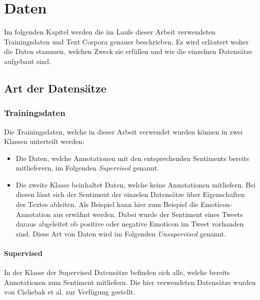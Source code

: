 \chapter{Daten}
Im  folgenden Kapitel werden die im Laufe dieser Arbeit verwendeten Trainingsdaten und Text Corpora genauer beschrieben. Es wird erläutert woher die Daten stammen, welchen Zweck sie erfüllen und wie die einzelnen Datensätze aufgebaut sind.

\section{Art der Datensätze}
\subsection{Trainingsdaten}
Die Trainingsdaten, welche in dieser Arbeit verwendet wurden können in zwei Klassen unterteilt werden:

\begin{itemize}
	\item Die Daten, welche Annotationen mit den entsprechenden Sentiments bereits mitlieferern, im Folgenden \emph{Supervised} genannt.
	\item Die zweite Klasse beinhaltet Daten, welche keine Annotationen mitliefern. Bei diesen lässt sich der Sentiment der einzelen Datensätze über Eigenschaften des Textes ableiten. Als Beispiel kann hier zum Beispiel die Emoticon-Annotation aus \cite{DeriuMasterThesis} erwähnt werden. Dabei wurde der Sentiment eines Tweets daraus abgeleitet ob positive oder negative Emoticon im Tweet vorhanden sind. Diese Art von Daten wird im Folgenden \emph{Unsupervised} genannt.
\end{itemize}

\subsubsection{Supervised}
In der Klasse der Supervised Datensätze befinden sich alle, welche bereits Annotationen zum Sentiment mitliefern. Die hier verwendeten Datensätze wurden von Cieliebak et al. \cite{CielEtAlEssem} zur Verfügung gestellt.\\

